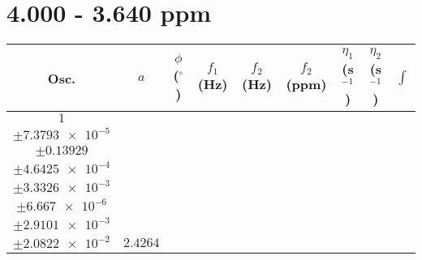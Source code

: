 \documentclass[8pt]{article}
\begin{document}
\section*{4.000 - 3.640 ppm}
\begin{longtable}[l]{c c c c c c c c c}
\toprule
Osc. & $a$ & $\phi$ ($^{\circ}$) & $f_1$ (Hz) & $f_2$ (Hz) & $f_2$ (ppm) & $\eta_1$ (s$^{-1}$) & $\eta_2$ (s$^{-1}$) & $\int$\\
\midrule
$\num{1}$ & \begin{tabular}[c]{@{}c@{}}$\num{3.062e-2}$ \\ $\pm\num{7.3793e-5}$\end{tabular} & \begin{tabular}[c]{@{}c@{}}$\num{-0.12196}$ \\ $\pm\num{0.13929}$\end{tabular} & \begin{tabular}[c]{@{}c@{}}$\num{-9.0991}$ \\ $\pm\num{4.6425e-4}$\end{tabular} & \begin{tabular}[c]{@{}c@{}}$\num{1.8485e+3}$ \\ $\pm\num{3.3326e-3}$\end{tabular} & \begin{tabular}[c]{@{}c@{}}$\num{3.698}$ \\ $\pm\num{6.667e-6}$\end{tabular} & \begin{tabular}[c]{@{}c@{}}$\num{1.1743}$ \\ $\pm\num{2.9101e-3}$\end{tabular} & \begin{tabular}[c]{@{}c@{}}$\num{4.0829}$ \\ $\pm\num{2.0822e-2}$\end{tabular} & $\num{2.4264}$\\

\end{longtable}
\end{document}
